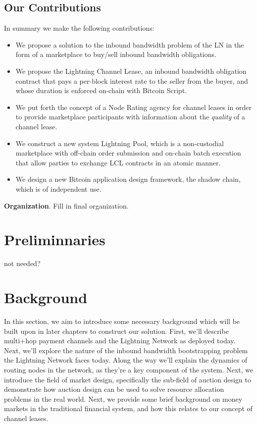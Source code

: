 \documentclass[12pt,a4paper]{article}
\theoremstyle{definition}
\begin{document}
\subsection{Our Contributions}

In summary we make the following contributions: \begin{itemize} \item We
        propose a solution to the inbound bandwidth problem of the LN in the
        form of a marketplace to buy/sell inbound bandwidth obligations.
    \item We propose the Lightning Channel Lease, an inbound bandwidth
        obligation contract that pays a per-block interest rate to the seller
        from the buyer, and whose duration is enforced on-chain with Bitcoin
        Script.  \item We put forth the concept of a Node Rating agency for
        channel leases in order to provide marketplace participants with
        information about the \emph{quality} of a channel lease.  \item We
        construct a new system Lightning Pool, which is a non-custodial
        marketplace with off-chain order submission and on-chain batch
        execution that allow parties to exchange LCL contracts in an atomic
        manner.  \item We design a new Bitcoin application design framework,
the shadow chain, which is of independent use.  \end{itemize}


 \textbf{Organization}. Fill in final organization.


\section{Preliminnaries}

not needed?



\section{Background}

In this section, we aim to introduce some necessary background which will be
built upon in later chapters to construct our solution. First, we'll describe
multi+hop payment channels and the Lightning Network as deployed today. Next,
we'll explore the nature of the inbound bandwidth bootstrapping problem the
Lightning Network faces today. Along the way we'll explain the dynamics of
routing nodes in the network, as they're a key component of the system. Next,
we introduce the field of market design, specifically the sub-field of auction
design to demonstrate how auction design can be used to solve resource
allocation problems in the real world. Next, we provide some brief background
on money markets in the traditional financial system, and how this relates to
our concept of channel leases.
\end{document}
